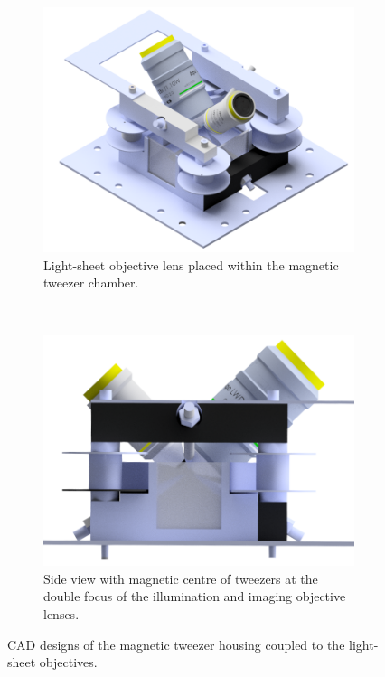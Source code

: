 \begin{figure}
 \centering
 \begin{subfigure}[t]{0.45\textwidth}
  \centering
  \includegraphics[width=\textwidth]{tweezer_spim_render_shooped}
  \caption{Light-sheet objective lens placed within the magnetic tweezer chamber.}
 \end{subfigure}~
 \begin{subfigure}[t]{0.45\textwidth}
  \centering
  \includegraphics[width=\textwidth]{tweezer_spim_render_side}
  \caption{Side view with magnetic centre of tweezers at the double focus of the illumination and imaging objective lenses.}
 \end{subfigure}
 \caption{CAD designs of the magnetic tweezer housing coupled to the light-sheet objectives.}\label{fig:tweezer_spim}
\end{figure}
